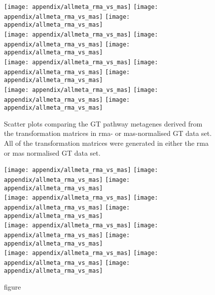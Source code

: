 	\begin{figure}[htp!]
		\centering
		\texttt{[image: appendix/allmeta\_rma\_vs\_mas]}
		\texttt{[image: appendix/allmeta\_rma\_vs\_mas]}
		\texttt{[image: appendix/allmeta\_rma\_vs\_mas]}\\
		\texttt{[image: appendix/allmeta\_rma\_vs\_mas]}
		\texttt{[image: appendix/allmeta\_rma\_vs\_mas]}
		\texttt{[image: appendix/allmeta\_rma\_vs\_mas]}\\
		\texttt{[image: appendix/allmeta\_rma\_vs\_mas]}
		\texttt{[image: appendix/allmeta\_rma\_vs\_mas]}
		\texttt{[image: appendix/allmeta\_rma\_vs\_mas]}\\
		\texttt{[image: appendix/allmeta\_rma\_vs\_mas]}
		\texttt{[image: appendix/allmeta\_rma\_vs\_mas]}
		\texttt{[image: appendix/allmeta\_rma\_vs\_mas]}\\
		\caption[Comparison of the normalisation methods used for the pathway metagene TM and the GT data]{Scatter plots comparing the GT pathway metagenes derived from the transformation matrices in \gls{rma}- or \gls{mas}-normalised GT data set.
		All of the transformation matrices were generated in either the \gls{rma} or \gls{mas} normalised GT data set.
		}
		\label{fig:appendix/gt_meta_rma_mas}
	\end{figure}

	\begin{figure}[htpb]
		\ContinuedFloat
		\captionsetup{list=off,format=cont}
		\centering
		\texttt{[image: appendix/allmeta\_rma\_vs\_mas]}
		\texttt{[image: appendix/allmeta\_rma\_vs\_mas]}
		\texttt{[image: appendix/allmeta\_rma\_vs\_mas]}\\
		\texttt{[image: appendix/allmeta\_rma\_vs\_mas]}
		\texttt{[image: appendix/allmeta\_rma\_vs\_mas]}
		\texttt{[image: appendix/allmeta\_rma\_vs\_mas]}\\
		\texttt{[image: appendix/allmeta\_rma\_vs\_mas]}
		\texttt{[image: appendix/allmeta\_rma\_vs\_mas]}
		\texttt{[image: appendix/allmeta\_rma\_vs\_mas]}\\
		\texttt{[image: appendix/allmeta\_rma\_vs\_mas]}
		\texttt{[image: appendix/allmeta\_rma\_vs\_mas]}
		\texttt{[image: appendix/allmeta\_rma\_vs\_mas]}\\
		\caption[]{figure}
	\end{figure}

